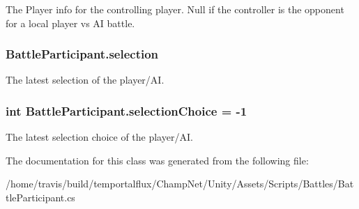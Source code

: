 The Player info for the controlling player. Null if the controller is the opponent for a local player vs A\-I battle. 

\hypertarget{class_battle_participant_abf036cb064ddcd97270c1b9ed8442f50}{
\subsubsection[{selection}]{ Battle\-Participant.\-selection}}\label{class_battle_participant_abf036cb064ddcd97270c1b9ed8442f50}


The latest selection of the player/\-A\-I. 

\hypertarget{class_battle_participant_a30032b373a898bbb16f67e24bf245557}{
\subsubsection[{selection\-Choice}]{\setlength{\rightskip}{0pt plus 5cm}int Battle\-Participant.\-selection\-Choice = -\/1}}\label{class_battle_participant_a30032b373a898bbb16f67e24bf245557}


The latest selection choice of the player/\-A\-I. 



The documentation for this class was generated from the following file\-:\begin{DoxyCompactItemize}
\item 
/home/travis/build/temportalflux/\-Champ\-Net/\-Unity/\-Assets/\-Scripts/\-Battles/Battle\-Participant.\-cs\end{DoxyCompactItemize}

